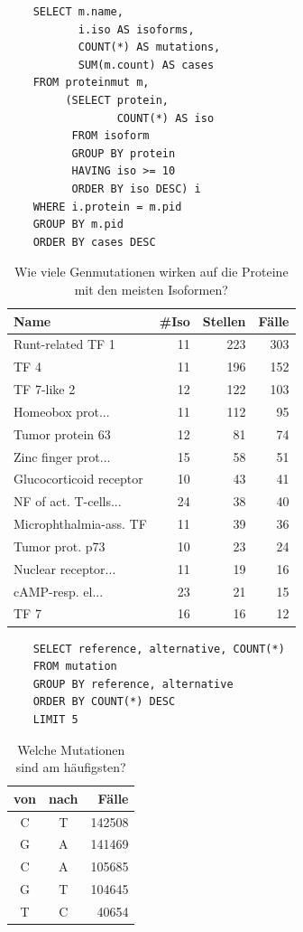 \documentclass{scrartcl}
\begin{document}
\begin{table}[H]
	\noindent\begin{minipage}{.4\hsize}
	\begin{verbatim}
	SELECT m.name,
	       i.iso AS isoforms,
	       COUNT(*) AS mutations,
	       SUM(m.count) AS cases
	FROM proteinmut m,
	     (SELECT protein,
	             COUNT(*) AS iso
	      FROM isoform
	      GROUP BY protein
	      HAVING iso >= 10
	      ORDER BY iso DESC) i
	WHERE i.protein = m.pid
	GROUP BY m.pid
	ORDER BY cases DESC
	\end{verbatim}
	\end{minipage}
	\begin{minipage}{.6\hsize}
	\hfill\begin{tabular}{lrrr}
	\toprule
	Name & \#Iso & Stellen & Fälle \\
	\midrule
	Runt-related TF 1&11&223&303\\
	TF 4&11&196&152\\
	TF 7-like 2&12&122&103\\
	Homeobox prot...&11&112&95\\
	Tumor protein 63&12&81&74\\
	Zinc finger prot...&15&58&51\\
	Glucocorticoid receptor&10&43&41\\
	NF of act. T-cells...&24&38&40\\
	Microphthalmia-ass. TF&11&39&36\\
	Tumor prot. p73&10&23&24\\
	Nuclear receptor...&11&19&16\\
	cAMP-resp. el...&23&21&15\\
	TF 7&16&16&12\\
	\bottomrule
	\end{tabular}
	\end{minipage}
	\caption{Wie viele Genmutationen wirken auf die Proteine mit den meisten Isoformen?}\label{q4}
\end{table}

\begin{table}[H]
	\noindent\begin{minipage}{.4\hsize}
	\begin{verbatim}
	SELECT reference, alternative, COUNT(*)
	FROM mutation
	GROUP BY reference, alternative
	ORDER BY COUNT(*) DESC
	LIMIT 5
	\end{verbatim}
	\end{minipage}
	\begin{minipage}{.6\hsize}
	\hfill\begin{tabular}{ccr}
	\toprule
	von & nach & Fälle \\
	\midrule
	C&T&142508\\
	G&A&141469\\
	C&A&105685\\
	G&T&104645\\
	T&C&40654\\
	\bottomrule
	\end{tabular}
	\end{minipage}
	\caption{Welche Mutationen sind am häufigsten?}\label{q5}
\end{table}
\end{document}
